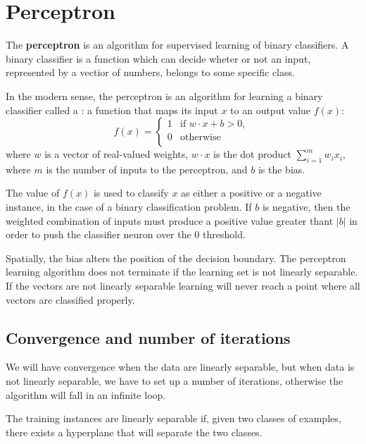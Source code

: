 \section{Perceptron}

The \textbf{perceptron} is an algorithm for supervised learning of binary classifiers. A binary classifier is a function which can decide wheter or not an input, represented by a vectior of numbers, belongs to some specific class. 

In the modern sense, the perceptron is an algorithm for learning a binary classifier called a : a function that maps its input \(x\) to an output value \(f(x)\):
\begin{equation}
    f(x) = \begin{cases}
        1               &\text{if \(w \cdot x + b > 0\), } \\
        0               &\text{otherwise}\\
    \end{cases}
\end{equation}
where \(w\) is a vector of real-valued weights, \(w \cdot x\) is the dot product \(\sum_{i=1}^mw_ix_i\), where \(m\) is the number of inputs to the perceptron, and \(b\) is the bias.

The value of \(f(x)\) is used to classify \(x\) as either a positive or a negative instance, in the case of a binary classification problem. If \(b\) is negative, then the weighted combination of inputs must produce a positive value greater thant \(|b|\) in order to push the classifier neuron over the 0 threshold.

Spatially, the bias alters the position of the decision boundary. The perceptron learning algorithm does not terminate if the learning set is not linearly separable. If the vectors are not linearly separable learning will never reach a point where all vectors are classified properly. 

\subsection{Convergence and number of iterations}
We will have convergence when the data are linearly separable, but when data is not linearly separable, we have to set up a number of iterations, otherwise the algorithm will fall in an infinite loop.

The training instances are linearly separable if, given two classes of examples, there exists a hyperplane that will separate the two classes.


